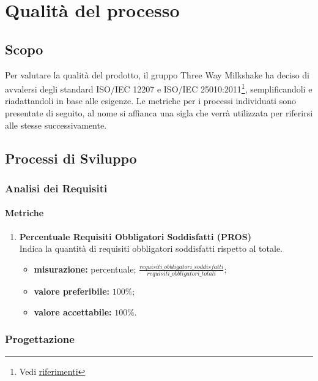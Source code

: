 \section{Qualità del processo}

\subsection{Scopo}
Per valutare  la qualità del prodotto, il gruppo Three Way Milkshake ha deciso di avvalersi degli standard ISO/IEC 12207 e ISO/IEC 25010:2011\footnote{Vedi \hyperref[ref]{riferimenti}}, semplificandoli e riadattandoli in base alle esigenze. Le metriche per i processi individuati sono presentate di seguito, al nome si affianca una sigla che verrà utilizzata per riferirsi alle stesse successivamente.

\subsection{Processi di Sviluppo}

\subsubsection{Analisi dei Requisiti}
\paragraph{Metriche}
\begin{enumerate}
	\item []
	      \textbf{Percentuale Requisiti Obbligatori Soddisfatti (PROS)}\\
	      Indica la quantità di requisiti obbligatori soddisfatti rispetto al totale.
	      \begin{itemize}
		      \item \textbf{misurazione:} percentuale; $\frac{requisiti\_obbligatori\_soddisfatti}{requisiti\_obbligatori\_totali}$;
		      \item \textbf{valore preferibile:} $100\%$;
		      \item \textbf{valore accettabile:} $100\%$.
	      \end{itemize}
\end{enumerate}
\subsubsection{Progettazione}
